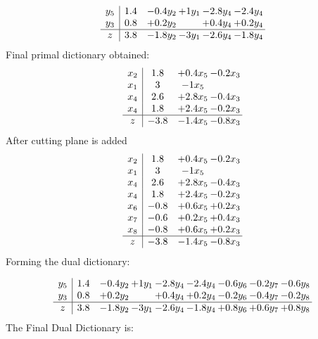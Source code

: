 \documentclass[11pt]{article}
\begin{document}
\[\begin{array}{c| c c@{\hskip 2pt} c@{\hskip 2pt} c@{\hskip 2pt} c@{\hskip 2pt} }
 y_{5}   &  1.4 & -0.4 y_{2} & + 1 y_{1} & -2.8 y_{4} & -2.4 y_{4}\\
 y_{3}   &  0.8 & + 0.2 y_{2} &   & + 0.4 y_{4} & + 0.2 y_{4}\\
\hline
z    &  3.8 & -1.8 y_{2} & -3 y_{1} & -2.6 y_{4} & -1.8 y_{4}\\
\end{array}\]
 Final primal dictionary obtained: 
\[\begin{array}{c| c c@{\hskip 2pt} c@{\hskip 2pt} }
 x_{2}   &  1.8 & + 0.4 x_{5} & -0.2 x_{3}\\
 x_{1}   &  3 & -1 x_{5} &   \\
 x_{4}   &  2.6 & + 2.8 x_{5} & -0.4 x_{3}\\
 x_{4}   &  1.8 & + 2.4 x_{5} & -0.2 x_{3}\\
\hline
z    &  -3.8 & -1.4 x_{5} & -0.8 x_{3}\\
\end{array}\]
 After cutting plane is added 
\[\begin{array}{c| c c@{\hskip 2pt} c@{\hskip 2pt} }
 x_{2}   &  1.8 & + 0.4 x_{5} & -0.2 x_{3}\\
 x_{1}   &  3 & -1 x_{5} &   \\
 x_{4}   &  2.6 & + 2.8 x_{5} & -0.4 x_{3}\\
 x_{4}   &  1.8 & + 2.4 x_{5} & -0.2 x_{3}\\
 x_{6}   &  -0.8 & + 0.6 x_{5} & + 0.2 x_{3}\\
 x_{7}   &  -0.6 & + 0.2 x_{5} & + 0.4 x_{3}\\
 x_{8}   &  -0.8 & + 0.6 x_{5} & + 0.2 x_{3}\\
\hline
z    &  -3.8 & -1.4 x_{5} & -0.8 x_{3}\\
\end{array}\]
Forming the dual dictionary:

\[\begin{array}{c| c c@{\hskip 2pt} c@{\hskip 2pt} c@{\hskip 2pt} c@{\hskip 2pt} c@{\hskip 2pt} c@{\hskip 2pt} c@{\hskip 2pt} }
 y_{5}   &  1.4 & -0.4 y_{2} & + 1 y_{1} & -2.8 y_{4} & -2.4 y_{4} & -0.6 y_{6} & -0.2 y_{7} & -0.6 y_{8}\\
 y_{3}   &  0.8 & + 0.2 y_{2} &   & + 0.4 y_{4} & + 0.2 y_{4} & -0.2 y_{6} & -0.4 y_{7} & -0.2 y_{8}\\
\hline
z    &  3.8 & -1.8 y_{2} & -3 y_{1} & -2.6 y_{4} & -1.8 y_{4} & + 0.8 y_{6} & + 0.6 y_{7} & + 0.8 y_{8}\\
\end{array}\]
The Final Dual Dictionary is: 
\end{document}
